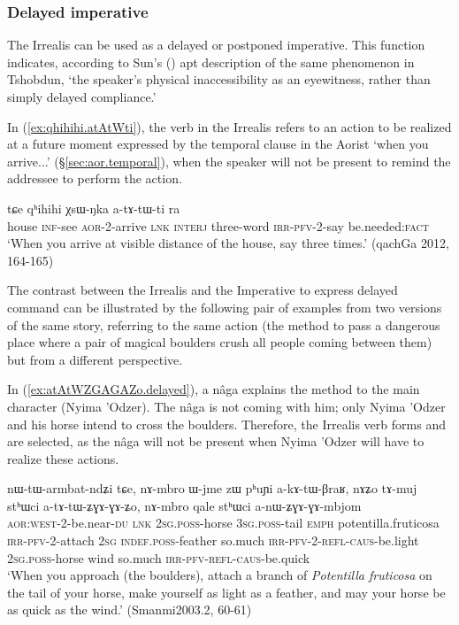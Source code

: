  
\subsubsection{Delayed imperative} \label{sec:irrealis.delayed.imp}
The Irrealis can be used as a delayed or postponed imperative. This function indicates, according to Sun's (\citeyear[809]{jackson07irrealis}) apt description of the same phenomenon in Tshobdun, `the  speaker’s  physical  inaccessibility  as  an  eyewitness,  rather  than  simply  delayed  compliance.'

In (\ref{ex:qhihihi.atAtWti}), the verb in the Irrealis  refers to an action to be realized at a future moment expressed by the temporal clause in the Aorist  `when you arrive...' (§\ref{sec:aor.temporal}), when the speaker will not be present to remind the addressee to perform the action.

\begin{exe}
\ex \label{ex:qhihihi.atAtWti}
 tɕe qʰihihi χsɯ-ŋka a-tɤ-tɯ-ti ra \\
house \textsc{inf}-see \textsc{aor}-2-arrive \textsc{lnk} \textsc{interj} three-word \textsc{irr}-\textsc{pfv}-2-say be.needed:\textsc{fact} \\
\glt `When you arrive at visible distance of the house, say  three times.' (qachGa 2012, 164-165)
\end{exe}

The contrast between the Irrealis and the Imperative to express delayed command can be illustrated by the following pair of examples from two versions of the same story, referring to the same action (the method to pass a dangerous place where a pair of magical boulders crush all people coming between them) but from a different perspective. 

In (\ref{ex:atAtWZGAGAZo.delayed}), a nâga explains the method to the main character (Nyima 'Odzer). The nâga is not coming with him; only Nyima 'Odzer and his horse intend to cross the boulders. Therefore, the Irrealis verb forms  and  are selected, as the nâga will not be present when Nyima 'Odzer will have to realize these actions. 

\begin{exe}
\ex \label{ex:atAtWZGAGAZo.delayed}
\gll nɯ-tɯ-armbat-ndʑi tɕe, nɤ-mbro ɯ-jme zɯ pʰuɲi a-kɤ-tɯ-βraʁ, nɤʑo tɤ-muj stʰɯci a-tɤ-tɯ-ʑɣɤ-ɣɤ-ʑo, nɤ-mbro qale stʰɯci a-nɯ-ʑɣɤ-ɣɤ-mbjom \\
\textsc{aor}:\textsc{west}-2-be.near-\textsc{du} \textsc{lnk} \textsc{2sg}.\textsc{poss}-horse \textsc{3sg}.\textsc{poss}-tail \textsc{emph} potentilla.fruticosa \textsc{irr}-\textsc{pfv}-2-attach \textsc{2sg} \textsc{indef}.\textsc{poss}-feather so.much \textsc{irr}-\textsc{pfv}-2-\textsc{refl}-\textsc{caus}-be.light \textsc{2sg}.\textsc{poss}-horse wind so.much \textsc{irr}-\textsc{pfv}-\textsc{refl}-\textsc{caus}-be.quick \\
\glt `When you approach (the boulders), attach a branch of \textit{Potentilla fruticosa} on the tail of your horse, make yourself as light as a feather, and may your horse be as quick as the wind.' (Smanmi2003.2, 60-61)
\end{exe}


